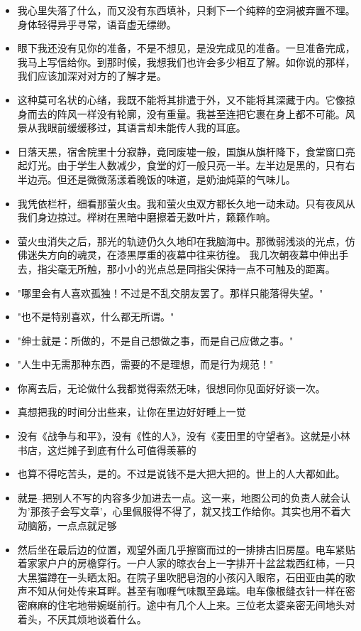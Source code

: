 \documentclass[UTF8,a4paper,8pt]{ctexart}
\begin{document}
\begin{itemize}
 	\item 我心里失落了什么，而又没有东西填补，只剩下一个纯粹的空洞被弃置不理。身体轻得异乎寻常，语音虚无缥缈。
 	\item 眼下我还没有见你的准备，不是不想见，是没完成见的准备。一旦准备完成，我马上写信给你。到那时候，我想我们也许会多少相互了解。如你说的那样，我们应该加深对对方的了解才是。
 	\item 这种莫可名状的心绪，我既不能将其排遣于外，又不能将其深藏于内。它像掠身而去的阵风一样没有轮廓，没有重量。我甚至连把它裹在身上都不可能。风景从我眼前缓缓移过，其语言却未能传人我的耳底。
 	\item 日落天黑，宿舍院里十分寂静，竟同废墟一般，国旗从旗杆降下，食堂窗口亮起灯光。由于学生人数减少，食堂的灯一般只亮一半。左半边是黑的，只有右半边亮。但还是微微荡漾着晚饭的味道，是奶油炖菜的气味儿。
 	\item 我凭依栏杆，细看那萤火虫。我和萤火虫双方都长久地一动未动。只有夜风从我们身边掠过。榉树在黑暗中磨擦着无数叶片，籁籁作响。
 	\item 萤火虫消失之后，那光的轨迹仍久久地印在我脑海中。那微弱浅淡的光点，仿佛迷失方向的魂灵，在漆黑厚重的夜幕中往来彷徨。 我几次朝夜幕中伸出手去，指尖毫无所触，那小小的光点总是同指尖保持一点不可触及的距离。
 	\item "哪里会有人喜欢孤独！不过是不乱交朋友罢了。那样只能落得失望。"
 	\item "也不是特别喜欢，什么都无所谓。"
 	\item "绅士就是：所做的，不是自己想做之事，而是自己应做之事。"
 	\item "人生中无需那种东西，需要的不是理想，而是行为规范！"
 	\item 你离去后，无论做什么我都觉得索然无味，很想同你见面好好谈一次。
 	\item 真想把我的时间分出些来，让你在里边好好睡上一觉
 	\item 没有《战争与和平》，没有《性的人》，没有《麦田里的守望者》。这就是小林书店，这烂摊子到底有什么可值得羡慕的
 	\item 也算不得吃苦头，是的。不过是说钱不是大把大把的。世上的人大都如此。
 	\item 就是--把别人不写的内容多少加进去一点。这一来，地图公司的负责人就会认为'那孩子会写文章'，心里佩服得不得了，就又找工作给你。其实也用不着大动脑筋，一点点就足够
 	\item 然后坐在最后边的位置，观望外面几乎擦窗而过的一排排古旧房屋。电车紧贴着家家户户的房檐穿行。一户人家的晾衣台上一字排开十盆盆栽西红柿，一只大黑猫蹲在一头晒太阳。在院子里吹肥皂泡的小孩闪入眼帘，石田亚由美的歌声不知从何处传来耳畔。甚至有咖喱气味飘至鼻端。电车像根缝衣针一样在密密麻麻的住宅地带婉蜒前行。途中有几个人上来。三位老太婆亲密无间地头对着头，不厌其烦地谈着什么。

\end{itemize}
\end{document}
